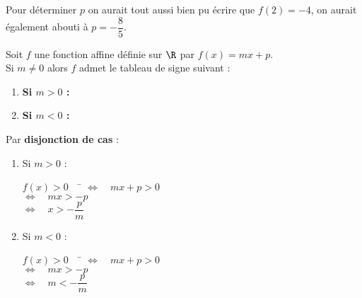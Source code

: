 \documentclass[a4paper,11pt,cours]{nsi}
\begin{document}
\begin{remarque}[]
	Pour déterminer $p$ on aurait tout aussi bien pu écrire que $f(2)=-4$, on aurait également abouti à $p=-\dfrac{8}{5}$.
\end{remarque}

\begin{propriete}
	Soit $f$ une fonction affine définie sur $\R$ par $f(x)=mx+p$.\\
	Si $m\neq 0$ alors $f$ admet le tableau de signe suivant :
	\begin{enumerate}[label=\textbullet]
		\item 	\textbf{\boldmath Si $m>0$ :}\begin{center}
		\end{center}
		
		\item 	\textbf{\boldmath Si $m<0$ :}\begin{center}
		\end{center}
	\end{enumerate}
\end{propriete}
\begin{demonstration}
	Par \textbf{disjonction de cas} :
	\begin{multicols}{2}
		\begin{enumerate}[label=\textbullet]
			\item 	Si $m>0$ :
			\begin{tabbing}
				$f(x)>0 \quad$		\=	$\Leftrightarrow\quad mx+p>0$\\
				\>	$\Leftrightarrow\quad mx>-p$\\
				\>	$\Leftrightarrow\quad x>-\dfrac{p}{m}$
			\end{tabbing}
			\item 	 	Si $m<0$ :
			\begin{tabbing}
				$f(x)>0 \quad$		\=	$\Leftrightarrow\quad mx+p>0$\\
				\>	$\Leftrightarrow\quad mx>-p$\\
				\>	$\Leftrightarrow\quad m<-\dfrac{p}{m}$
			\end{tabbing}
		\end{enumerate}
	\end{multicols}
	
\end{demonstration}
\end{document}
